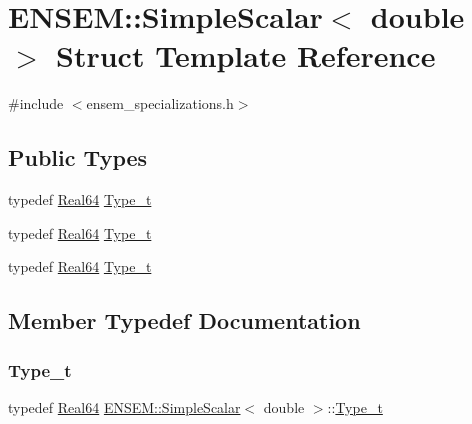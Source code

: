 \hypertarget{structENSEM_1_1SimpleScalar_3_01double_01_4}{}\section{E\+N\+S\+EM\+:\+:Simple\+Scalar$<$ double $>$ Struct Template Reference}
\label{structENSEM_1_1SimpleScalar_3_01double_01_4}


{\ttfamily \#include $<$ensem\+\_\+specializations.\+h$>$}

\subsection*{Public Types}
\begin{DoxyCompactItemize}
\item 
typedef \mbox{\hyperlink{group__defs_gaae0bff35c031375b1ffeb693402496c8}{Real64}} \mbox{\hyperlink{structENSEM_1_1SimpleScalar_3_01double_01_4_a1f42edea984ac3b783290e5043381603}{Type\+\_\+t}}
\item 
typedef \mbox{\hyperlink{group__defs_gaae0bff35c031375b1ffeb693402496c8}{Real64}} \mbox{\hyperlink{structENSEM_1_1SimpleScalar_3_01double_01_4_a1f42edea984ac3b783290e5043381603}{Type\+\_\+t}}
\item 
typedef \mbox{\hyperlink{group__defs_gaae0bff35c031375b1ffeb693402496c8}{Real64}} \mbox{\hyperlink{structENSEM_1_1SimpleScalar_3_01double_01_4_a1f42edea984ac3b783290e5043381603}{Type\+\_\+t}}
\end{DoxyCompactItemize}


\subsection{Member Typedef Documentation}
\mbox{\label{structENSEM_1_1SimpleScalar_3_01double_01_4_a1f42edea984ac3b783290e5043381603}} 
\subsubsection{\texorpdfstring{Type\_t}{Type\_t}\hspace{0.1cm}{\footnotesize\ttfamily [1/3]}}
{\footnotesize\ttfamily typedef \mbox{\hyperlink{group__defs_gaae0bff35c031375b1ffeb693402496c8}{Real64}} \mbox{\hyperlink{structENSEM_1_1SimpleScalar}{E\+N\+S\+E\+M\+::\+Simple\+Scalar}}$<$ double $>$\+::\mbox{\hyperlink{structENSEM_1_1SimpleScalar_3_01double_01_4_a1f42edea984ac3b783290e5043381603}{Type\+\_\+t}}}

